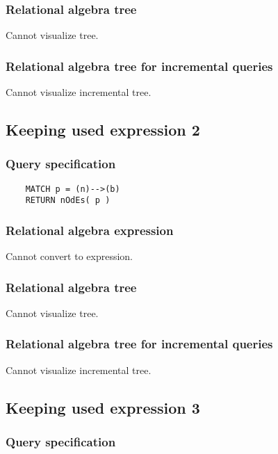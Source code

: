 	\subsubsection*{Relational algebra tree}

	Cannot visualize tree.

	\subsubsection*{Relational algebra tree for incremental queries}

	Cannot visualize incremental tree.
	\subsection{Keeping used expression 2}

	\subsubsection*{Query specification}

	\begin{lstlisting}
	MATCH p = (n)-->(b)
	RETURN nOdEs( p )
	\end{lstlisting}


	\subsubsection*{Relational algebra expression}

	Cannot convert to expression.

	\subsubsection*{Relational algebra tree}

	Cannot visualize tree.

	\subsubsection*{Relational algebra tree for incremental queries}

	Cannot visualize incremental tree.
	\subsection{Keeping used expression 3}

	\subsubsection*{Query specification}


